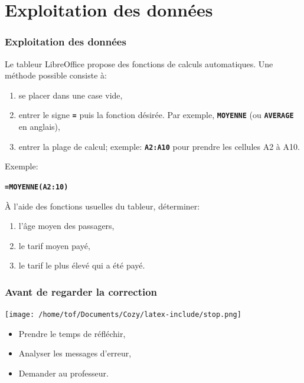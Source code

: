 \documentclass[svgnames,11pt]{beamer}
\begin{document}
\section{Exploitation des données}
\begin{frame}
    \frametitle{Exploitation des données}

    Le tableur LibreOffice propose des fonctions de calculs automatiques. Une méthode possible consiste à:
\begin{enumerate}
    \item se placer dans une case vide,
    \item entrer le signe \textbf{\texttt{=}} puis la fonction désirée. Par exemple, \textbf{\texttt{MOYENNE}} (ou \textbf{\texttt{AVERAGE}} en anglais),
    \item entrer la plage de calcul; exemple: \textbf{\texttt{A2:A10}} pour prendre les cellules A2 à A10.
\end{enumerate}

\vspace{1cm}
Exemple:
\begin{center}
    \textbf{\texttt{=MOYENNE(A2:10)}}
\end{center}
\end{frame}
\begin{frame}

    \begin{activite}
        À l’aide des fonctions usuelles du tableur, déterminer:
    \begin{enumerate}
        \item l’âge moyen des passagers,
        \item le tarif moyen payé,
        \item le tarif le plus élevé qui a été payé.
    \end{enumerate}
    \end{activite}

\end{frame}
\begin{frame}
    \frametitle{Avant de regarder la correction}
\begin{center}
    \centering
    \texttt{[image: /home/tof/Documents/Cozy/latex-include/stop.png]}
    \end{center}
{\Large
    \begin{itemize}
        \item Prendre le temps de réfléchir,
        \item Analyser les messages d'erreur,
        \item Demander au professeur.
    \end{itemize}
}
\end{frame}
\end{document}
